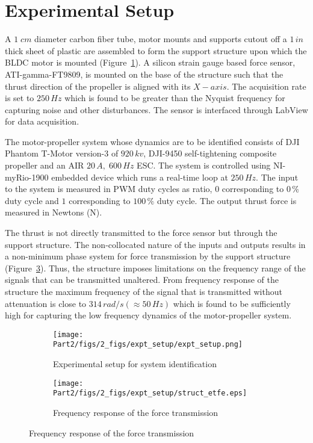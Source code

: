 \section{Experimental Setup}
\par A $1 \; cm$ diameter carbon fiber tube, motor mounts and supports cutout
off a $1\, in$ thick sheet of plastic are assembled to form the support
structure upon which the BLDC motor is mounted (Figure~\ref{fig::exptSetup}). A
silicon strain gauge based force sensor, ATI-gamma-FT9809, is mounted on the
base of the structure such that the thrust direction of the propeller is aligned
with its $X-axis$. The acquisition rate is set to $250\,Hz$ which is found to be
greater than the Nyquist frequency for capturing noise and other disturbances.
The sensor is interfaced through LabView for data acquisition.

\par The motor-propeller system whose dynamics are to be identified consists of
DJI Phantom T-Motor version-3 of $920\,kv$, DJI-9450 self-tightening  composite
propeller and an AIR $20\,A,\; 600\,Hz$ ESC. The system is controlled using
NI-myRio-1900 embedded device which runs a real-time loop at $250\,Hz$. The input
to the system is measured in PWM duty cycles as ratio, $0$ corresponding to
$0\,\%$ duty cycle and $1$ corresponding to $100 \, \%$ duty cycle. The output
thrust force is measured in Newtons (N).

\par The thrust is not directly transmitted to the force sensor but through the
support structure. The non-collocated nature of the inputs and outputs results
in a non-minimum phase system for force transmission by the support structure
(Figure~\ref{fig::freq_struct}). Thus, the structure imposes limitations on the
frequency range of the signals that can be transmitted unaltered. From frequency
response  of the structure the maximum frequency of the
signal that is transmitted without attenuation is close to $314 \, rad/s
(\approx 50 \, Hz)$ which is found to be sufficiently high for capturing the low
frequency dynamics of the motor-propeller system.

\begin{figure}[H]
    \begin{minipage}{0.49\textwidth}
        \begin{figure}[H]
            \centering
            \texttt{[image: Part2/figs/2\_figs/expt\_setup/expt\_setup.png]}
            \caption{Experimental setup for system identification}
            \label{fig::exptSetup}
        \end{figure}
    \end{minipage}
    \begin{minipage}{0.49\textwidth}
        \begin{figure}[H]
                \centering
                \texttt{[image: Part2/figs/2\_figs/expt\_setup/struct\_etfe.eps]}
                \caption{Frequency response of the force transmission}
                \label{fig::freq_struct}
        \end{figure}
    \end{minipage}
\end{figure}
